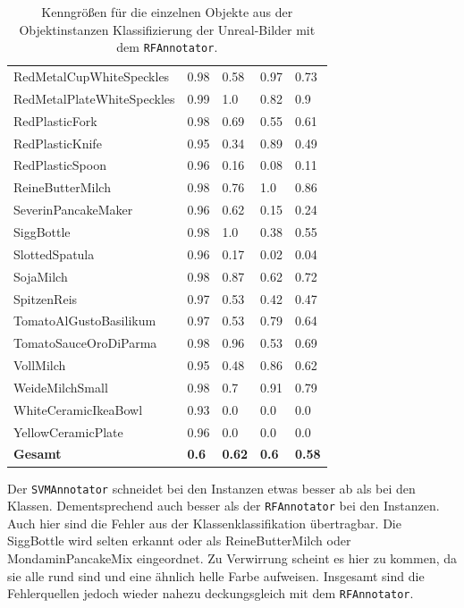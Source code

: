 \begin{table}
\begin{tabularx}{\textwidth}{Xllll}
RedMetalCupWhiteSpeckles & 0.98 & 0.58 & 0.97 & 0.73 \\  
RedMetalPlateWhiteSpeckles & 0.99 & 1.0 & 0.82 & 0.9 \\  
RedPlasticFork & 0.98 & 0.69 & 0.55 & 0.61 \\  
RedPlasticKnife & 0.95 & 0.34 & 0.89 & 0.49 \\  
RedPlasticSpoon & 0.96 & 0.16 & 0.08 & 0.11 \\  
ReineButterMilch & 0.98 & 0.76 & 1.0 & 0.86 \\  
SeverinPancakeMaker & 0.96 & 0.62 & 0.15 & 0.24 \\  
SiggBottle & 0.98 & 1.0 & 0.38 & 0.55 \\  
SlottedSpatula & 0.96 & 0.17 & 0.02 & 0.04 \\  
SojaMilch & 0.98 & 0.87 & 0.62 & 0.72 \\  
SpitzenReis & 0.97 & 0.53 & 0.42 & 0.47 \\  
TomatoAlGustoBasilikum & 0.97 & 0.53 & 0.79 & 0.64 \\  
TomatoSauceOroDiParma & 0.98 & 0.96 & 0.53 & 0.69 \\  
VollMilch & 0.95 & 0.48 & 0.86 & 0.62 \\  
WeideMilchSmall & 0.98 & 0.7 & 0.91 & 0.79 \\  
WhiteCeramicIkeaBowl & 0.93 & 0.0 & 0.0 & 0.0 \\  
YellowCeramicPlate & 0.96 & 0.0 & 0.0 & 0.0 \\   \hline
\textbf{Gesamt}		&	\textbf{0.6}   &	\textbf{0.62}  & \textbf{0.6}     &  \textbf{0.58}     \\
\end{tabularx}
\caption[Objektinstanzen-spezifische Kenngrößen des RFAnnotators]{Kenngrößen für die einzelnen Objekte aus der Objektinstanzen Klassifizierung der Unreal-Bilder mit dem \texttt{RFAnnotator}.}
\label{tab:RFClassifierGTInstance_metrics}
\end{table}

Der \texttt{SVMAnnotator} schneidet bei den Instanzen etwas besser ab als bei den Klassen. Dementsprechend auch besser als der \texttt{RFAnnotator} bei den Instanzen. Auch hier sind die Fehler aus der Klassenklassifikation übertragbar. Die SiggBottle wird selten erkannt oder als ReineButterMilch oder MondaminPancakeMix eingeordnet. Zu Verwirrung scheint es hier zu kommen, da sie alle rund sind und eine ähnlich helle Farbe aufweisen. Insgesamt sind die Fehlerquellen jedoch wieder nahezu deckungsgleich mit dem \texttt{RFAnnotator}.

